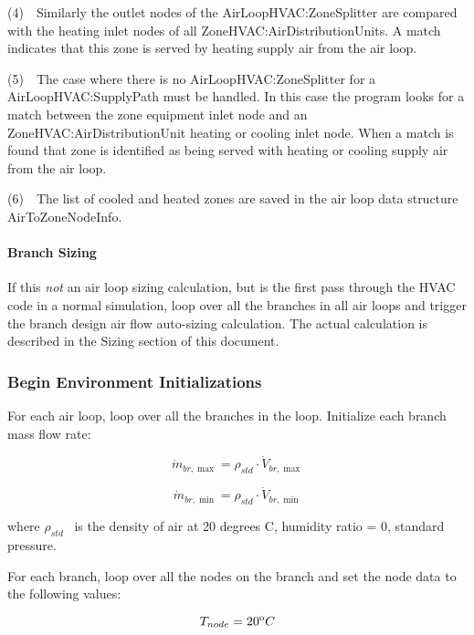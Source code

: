 (4)~~Similarly the outlet nodes of the AirLoopHVAC:ZoneSplitter are compared with the heating inlet nodes of all ZoneHVAC:AirDistributionUnits. A match indicates that this zone is served by heating supply air from the air loop.

(5)~~The case where there is no AirLoopHVAC:ZoneSplitter for a AirLoopHVAC:SupplyPath must be handled. In this case the program looks for a match between the zone equipment inlet node and an ZoneHVAC:AirDistributionUnit heating or cooling inlet node. When a match is found that zone is identified as being served with heating or cooling supply air from the air loop.

(6)~~The list of cooled and heated zones are saved in the air loop data structure AirToZoneNodeInfo.

\paragraph{Branch Sizing}\label{branch-sizing}

If this \emph{not} an air loop sizing calculation, but is the first pass through the HVAC code in a normal simulation, loop over all the branches in all air loops and trigger the branch design air flow auto-sizing calculation. The actual calculation is described in the Sizing section of this document.

\subsubsection{Begin Environment Initializations}\label{begin-environment-initializations}

For each air loop, loop over all the branches in the loop. Initialize each branch mass flow rate:

\begin{equation}
{\dot m_{br,\max }} = {\rho_{std}} \cdot {\dot V_{br,\max }}
\end{equation}

\begin{equation}
{\dot m_{br,\min }} = {\rho_{std}} \cdot {\dot V_{br,\min }}
\end{equation}

where \({\rho_{std}}\) ~is the density of air at 20 degrees C, humidity ratio = 0, standard pressure.

For each branch, loop over all the nodes on the branch and set the node data to the following values:

\begin{equation}
{T_{node}} = {20^{\rm{o}}}C
\end{equation}

